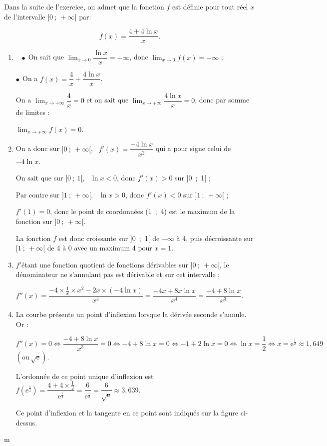 Dans la suite de l'exercice, on admet que la fonction $f$ est définie pour tout réel $x$ de l'intervalle $]0~;~ +\infty[$ par:

\[f(x) = \dfrac{4 + 4\ln x}{x}.\]

\begin{enumerate}[resume]
\item ~%
$\bullet~~$On sait que $\displaystyle\lim_{x \to 0} \dfrac{\ln x}{x} = - \infty$, donc 
$\displaystyle\lim_{x \to 0} f(x) = - \infty$ ;

$\bullet~~$On a $f(x) = \dfrac{4}{x} + \dfrac{4\ln x}{x}$.

On a $\displaystyle\lim_{x \to + \infty}\dfrac{4}{x} = 0$ et on sait que $\displaystyle\lim_{x \to + \infty}\dfrac{4\ln x}{x} = 0$, donc par somme de limites : 

$\displaystyle\lim_{x \to + \infty}f(x) = 0$.
\item %
On a donc sur $]0~;~+ \infty[$, \, $f'(x) = \dfrac{-4\ln x}{x^2}$ qui a pour signe celui de $-4\ln x$.

On sait que sur $]0~;~1[$, \, $\ln x < 0$, donc $f'(x) > 0$ sur ]0~;~1[ ;

Par contre sur $]1~;~+ \infty[$, \, $\ln x > 0$, donc $f'(x) < 0$ sur $]1~;~+ \infty[$ ;

$f'(1) = 0$, donc le point de coordonnées (1~;~4) est le maximum de la fonction sur $]0~;~+ \infty[$.

La fonction $f$ est donc croissante sur ]0~;~1[ de $- \infty$ à 4, puis décroissante sur $[1~;~+ \infty[$ de 4 à 0 avec un maximum 4 pour $x = 1$.
\item %
$f'$étant une fonction quotient de fonctions dérivables sur $]0~;~+ \infty[$, le dénominateur ne s'annulant pas est dérivable et sur cet intervalle :

$f''(x) = \dfrac{-4 \times \frac{1}{x} \times x^2 - 2x \times (- 4\ln x)}{x^4} = \dfrac{- 4x + 8x\ln x}{x^4} = \dfrac{- 4 + 8\ln x}{x^3}.$

\item %
La courbe présente un point d'inflexion lorsque la dérivée seconde s'annule. Or :

$f''(x) = 0 \iff \dfrac{- 4 + 8\ln x}{x^3} = 0 \iff - 4 + 8\ln x = 0 \iff -1 + 2\ln x= 0 \iff \ln x= \dfrac{1}{2} \iff x = \text{e}^{\frac{1}{2}} \approx 1,649$ $\left(\text{ou}\, \sqrt{\text{e}} \right)$.

L'ordonnée de ce point unique d'inflexion est $f\left(\text{e}^{\frac{1}{2}}\right) = \dfrac{4 + 4\times \frac{1}{2}}{\text{e}^{\frac{1}{2}}} = \dfrac{6}{\text{e}^{\frac{1}{2}}} = \dfrac{6} {\sqrt{\text{e}}} \approx 3,639$.

Ce point d'inflexion et la tangente en ce point sont indiqués sur la figure ci-dessus.
\end{enumerate}

\begin{center}{\fontsize{18}{18}\selectfont m} 

\end{center}
